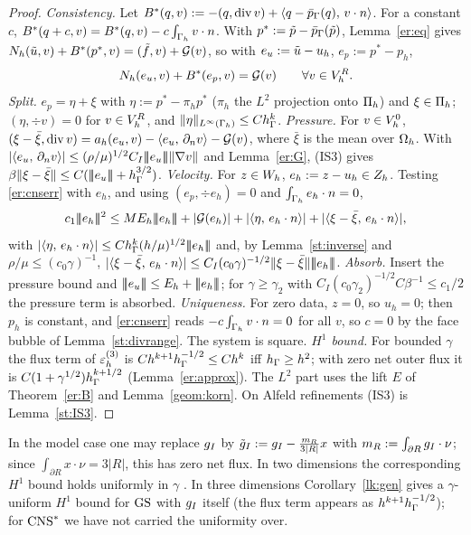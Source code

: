 \begin{proof}
\emph{Consistency.} Let $B^\ast(q,v):=-(q,\operatorname{div} v)+\langle q-\bar p_{\Gamma}(q),\, v\cdot n\rangle$. For a constant $c$, $B^\ast(q+c,v)=B^\ast(q,v)-c\int_{\Gamma_h}v\cdot n$. With $p^\ast:=\tilde p-\bar p_{\Gamma}(\tilde p)$, Lemma~\ref{er:eq} gives $N_h(\tilde u,v)+B^\ast(p^\ast,v)=(\tilde f,v)+\mathcal G(v)$, so with $e_u:=\tilde u-u_h$, $e_p:=p^\ast-p_h$,
\begin{equation}\label{er:cnserr}
N_h(e_u,v)+B^\ast(e_p,v)=\mathcal G(v)\qquad\forall v\in V_h^R .
\end{equation}
\emph{Split.} $e_p=\eta+\xi$ with $\eta:=p^\ast-\pi_hp^\ast$ ($\pi_h$ the $L^2$ projection onto $\Pi_h$) and $\xi\in\Pi_h$; $(\eta,\div v)=0$ for $v\in V_h^R$, and $\lVert \eta\rVert_{L^\infty(\Gamma_h)}\le Ch_\Gamma^k$.
\emph{Pressure.} For $v\in V_h^0$, $(\xi-\bar\xi,\operatorname{div} v)=a_h(e_u,v)-\langle e_u,\, \partial_n v\rangle-\mathcal G(v)$, where $\bar\xi$ is the mean over $\Omega_h$. With $|\langle e_u,\, \partial_n v\rangle|\le(\rho/\mu)^{1/2}C_I|\!|\!|e_u|\!|\!|\lVert \nabla v\rVert$ and Lemma~\ref{er:G}, (IS3) gives $\beta\lVert \xi-\bar\xi\rVert\le C(|\!|\!|e_u|\!|\!|+h_\Gamma^{3/2})$.
\emph{Velocity.} For $z\in W_h$, $e_h:=z-u_h\in Z_h$. Testing \eqref{er:cnserr} with $e_h$, and using $(e_p,\div e_h)=0$ and $\int_{\Gamma_h}e_h\cdot n=0$,
\[
c_1\tnorm{e_h}^2\le ME_h\tnorm{e_h}+|\Gc(e_h)|+|\ip\eta{e_h\cdot n}|+|\ip{\xi-\bar\xi}{e_h\cdot n}|,
\]
with $|\langle \eta,\, e_h\cdot n\rangle|\le Ch_\Gamma^k(h/\mu)^{1/2}|\!|\!|e_h|\!|\!|$ and, by Lemma~\ref{st:inverse} and $\rho/\mu\le(c_0\gamma)^{-1}$, $|\langle \xi-\bar\xi,\, e_h\cdot n\rangle|\le C_I(c_0\gamma)^{-1/2}\lVert \xi-\bar\xi\rVert|\!|\!|e_h|\!|\!|$.
\emph{Absorb.} Insert the pressure bound and $\tnorm{e_u}\le E_h+\tnorm{e_h}$; for $\gamma\ge\gamma_2$ with $C_I(c_0\gamma_2)^{-1/2}C\beta^{-1}\le c_1/2$ the pressure term is absorbed.
\emph{Uniqueness.} For zero data, $z=0$, so $u_h=0$; then $p_h$ is constant, and \eqref{er:cnserr} reads $-c\int_{\Gamma_h}v\cdot n=0$ for all $v$, so $c=0$ by the face bubble of Lemma~\ref{st:divrange}. The system is square.
\emph{$H^1$ bound.} For bounded $\gamma$ the flux term of $\varepsilon_h^{(3)}$ is $Ch^{k+1}h_\Gamma^{-1/2}\le Ch^k$ iff $h_\Gamma\ge h^2$; with zero net outer flux it is $C(1+\gamma^{1/2})h_\Gamma^{k+1/2}$ (Lemma~\ref{er:approx}). The $L^2$ part uses the lift $E$ of Theorem~\ref{er:B} and Lemma~\ref{geom:korn}. On Alfeld refinements (IS3) is Lemma~\ref{st:IS3}.
\end{proof}

\begin{remark}\label{er:rem:flux}
In the model case one may replace $g_I$ by $\tilde g_I:=g_I-\frac{m_R}{3|R|}x$ with $m_R:=\int_{\partial R}g_I\cdot\nu$; since $\int_{\partial R}x\cdot\nu=3|R|$, this has zero net flux. In two dimensions the corresponding $H^1$ bound holds uniformly in $\gamma$ \cite{PadhiLong2D}. In three dimensions Corollary~\ref{lk:gen} gives a $\gamma$-uniform $H^1$ bound for $\mathrm{GS}$ with $g_I$ itself (the flux term appears as $h^{k+1}h_\Gamma^{-1/2}$); for $\mathrm{CNS}^\ast$ we have not carried the uniformity over.
\end{remark}
